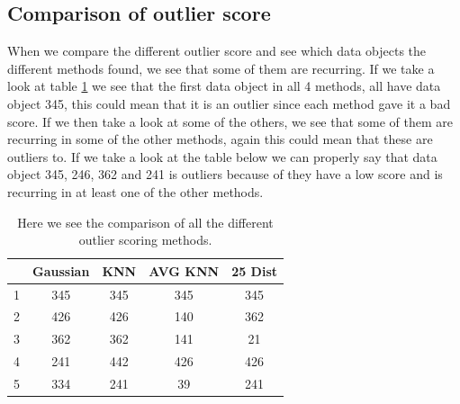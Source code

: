 \subsection{Comparison of outlier score}

When we compare the different outlier score and see which data objects the different methods found, we see that some of them are recurring. If we take a look at table \ref{compare} we see that the first data object in all 4 methods, all have data object 345, this could mean that it is an outlier since each method gave it a bad score. If we then take a look at some of the others, we see that some of them are recurring in some of the other methods, again this could mean that these are outliers to. If we take a look at the table below we can properly say that data object 345, 246, 362 and 241 is outliers because of they have a low score and is recurring in at least one of the other methods.
\begin{table}[H]
\begin{longtable}{lcccc}
\hline
  & Gaussian & KNN & AVG KNN & 25 Dist \\ \hline
1 & 345      & 345 & 345     & 345 \\ 
2 & 426      & 426 & 140     & 362 \\ 
3 & 362      & 362 & 141     & 21 \\ 
4 & 241      & 442 & 426     & 426 \\ 
5 & 334      & 241 & 39      & 241 \\ \hline
\end{longtable}
\label{compare}
\caption{\footnotesize Here we see the comparison of all the different outlier scoring methods.}
\end{table}